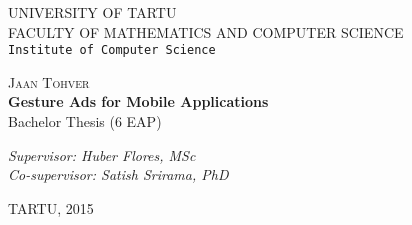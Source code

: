 \begin{titlepage}

\begin{center}



\textsc{UNIVERSITY OF TARTU}\\

\textsc{FACULTY OF MATHEMATICS AND COMPUTER SCIENCE}\\

\texttt{Institute of Computer Science}\\

\vspace{6 cm}


\textsc{ \large Jaan Tohver}\\[0.5cm]
{ \Huge \bfseries Gesture Ads for Mobile Applications}\\[0.5cm]
{\large Bachelor Thesis (6 EAP)}\\[3cm]



\begin{minipage}{0.8\textwidth}
\begin{flushright} \large
\emph{Supervisor: Huber Flores, MSc} \\
\emph{Co-supervisor: Satish Srirama, PhD} \\

\end{flushright}
\end{minipage}   

\vfill

{\large TARTU, 2015}

\end{center}

\end{titlepage}